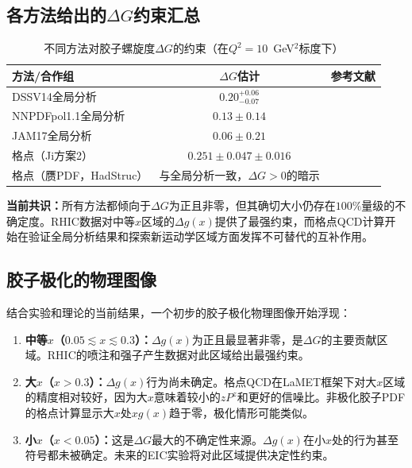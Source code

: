\documentclass[12pt,a4paper]{ctexart}
\theoremstyle{definition}
\begin{document}
\subsection{各方法给出的$\Delta G$约束汇总}

\begin{table}[H]
\centering
\caption{不同方法对胶子螺旋度$\Delta G$的约束（在$Q^2 = 10$~GeV$^2$标度下）}
\label{tab:DeltaG_summary}
\begin{tabular}{lcc}
\toprule
方法/合作组 & $\Delta G$估计 & 参考文献 \\
\midrule
DSSV14全局分析  & $0.20^{+0.06}_{-0.07}$ & \cite{DSSV14} \\
NNPDFpol1.1全局分析 & $0.13 \pm 0.14$ & \cite{NNPDFpol11} \\
JAM17全局分析   & $0.06 \pm 0.21$ & \cite{JAM17} \\
格点（Ji方案2） & $0.251 \pm 0.047 \pm 0.016$ & \cite{Ji2013gluon} \\
格点（赝PDF，HadStruc）& 与全局分析一致，$\Delta G > 0$的暗示 & \cite{Egerer2022} \\
\bottomrule
\end{tabular}
\end{table}

\textbf{当前共识：}所有方法都倾向于$\Delta G$为正且非零，但其确切大小仍存在$100\%$量级的不确定度。RHIC数据对中等$x$区域的$\Delta g(x)$提供了最强约束，而格点QCD计算开始在验证全局分析结果和探索新运动学区域方面发挥不可替代的互补作用\cite{Egerer2022}。

\subsection{胶子极化的物理图像}

结合实验和理论的当前结果，一个初步的胶子极化物理图像开始浮现\cite{Egerer2022,DSSV14}：

\begin{enumerate}
    \item \textbf{中等$x$（$0.05 \lesssim x \lesssim 0.3$）：}$\Delta g(x)$为正且最显著非零，是$\Delta G$的主要贡献区域。RHIC的喷注和强子产生数据对此区域给出最强约束\cite{DSSV14}。
    \item \textbf{大$x$（$x > 0.3$）：}$\Delta g(x)$行为尚未确定。格点QCD在LaMET框架下对大$x$区域的精度相对较好，因为大$x$意味着较小的$zP^z$和更好的信噪比。非极化胶子PDF的格点计算显示大$x$处$xg(x)$趋于零\cite{Chen2025gluon}，极化情形可能类似。
    \item \textbf{小$x$（$x < 0.05$）：}这是$\Delta G$最大的不确定性来源。$\Delta g(x)$在小$x$处的行为甚至符号都未被确定。未来的EIC实验将对此区域提供决定性约束\cite{Egerer2022}。
\end{enumerate}
\end{document}
